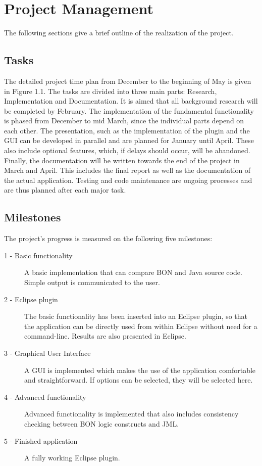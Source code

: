 \documentclass[]{mngt_deliverable}
\begin{document}
\chapter{Project Management}
The following sections give a brief outline of the realization of the project.

\section{Tasks}
The detailed project time plan from December to the beginning of May is given in Figure 1.1. The tasks are divided into three main parts: Research, Implementation and Documentation. It is aimed that all background research will be completed by February. The implementation of the fundamental functionality is phased from December to mid March, since the individual parts depend on each other. The presentation, such as the implementation of the plugin and the GUI can be developed in parallel and are planned for January until April. These also include optional features, which, if delays should occur, will be abandoned. Finally, the documentation will be written towards the end of the project in March and April. This includes the final report as well as the documentation of the actual application.
Testing and code maintenance are ongoing processes and are thus planned after each major task.
\section{Milestones}
The project's progress is measured on the following five milestones:
\begin{description}
\item[1 - Basic functionality] A basic implementation that can compare BON and Java source code. Simple output is communicated to the user.
\item[2 - Eclipse plugin] The basic functionality has been inserted into an Eclipse plugin, so that the application can be directly used from within Eclipse without need for a command-line. Results are also presented in Eclipse.
\item[3 - Graphical User Interface] A GUI is implemented which makes the use of the application comfortable and straightforward. If options can be selected, they will be selected here.
\item[4 - Advanced functionality] Advanced functionality is implemented that also includes consistency checking between BON logic constructs and JML.
\item[5 - Finished application] A fully working Eclipse plugin.
\end{description}
\end{document}
